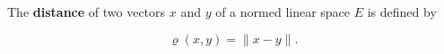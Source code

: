 The \textbf{distance} of two vectors $x$ and $y$ of a normed linear space $E$ is defined by

$$\varrho(x, y) = \| x - y \|.$$
